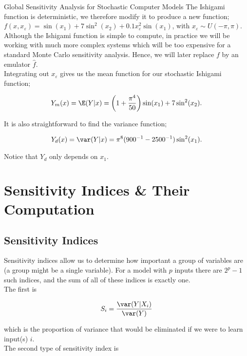\begin{chapter}{Global Sensitivity Analysis for Stochastic Computer Models}
The Ishigami function is deterministic, we therefore modify it to produce a new function; $f(x, x_\varepsilon) = \sin(x_1) + 7 \sin^2(x_2) + 0.1 x_\varepsilon^2 \sin(x_1)$, with $x_\varepsilon \sim U(-\pi, \pi)$. Although the Ishigami function is simple to compute, in practice we will be working with much more complex systems which will be too expensive for a standard Monte Carlo sensitivity analysis. Hence, we will later replace $f$ by an emulator $\hat{f}$.\\

Integrating out $x_\varepsilon$ gives us the mean function for our stochastic Ishigami function;

\begin{equation}
	Y_m(x) = \E(Y| x) = \left( 1 + \frac{\pi^4}{50} \right) \sin(x_1) + 7\sin^2(x_2).
\end{equation}

It is also straightforward to find the variance function;

\begin{equation}
	Y_d(x) = \var(Y|x) = \pi^8 (900^{-1} - 2500^{-1}) \sin^2(x_1).
\end{equation}

Notice that $Y_d$ only depends on $x_1$.

\section{Sensitivity Indices \& Their Computation}

\subsection{Sensitivity Indices}

Sensitivity indices allow us to determine how important a group of variables are (a group might be a single variable). For a model with $p$ inputs there are $2^p - 1$ such indices, and the sum of all of these indices is exactly one.\\

The first is

\begin{equation}
	S_i = \frac{\var(Y|X_i)}{\var(Y)}
\end{equation}

which is the proportion of variance that would be eliminated if we were to learn input(s) $i$.\\

The second type of sensitivity index is


\end{chapter}
